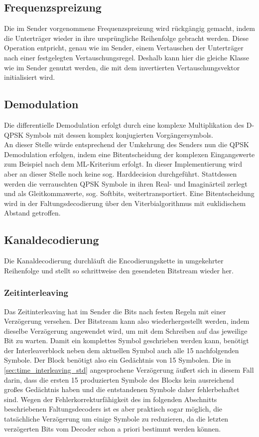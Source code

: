 \subsection{Frequenzspreizung}
Die im Sender vorgenommene Frequenzspreizung wird rückgängig gemacht, indem die Unterträger wieder in ihre ursprüngliche Reihenfolge gebracht werden. Diese Operation entpricht, genau wie im Sender, einem Vertauschen der Unterträger nach einer festgelegten Vertauschungsregel. Deshalb kann hier die gleiche Klasse wie im Sender genutzt werden, die mit dem invertierten Vertauschungsvektor initialisiert wird.

\subsection{Demodulation}
Die differentielle Demodulation erfolgt durch eine komplexe Multiplikation des D-QPSK Symbols mit dessen komplex konjugierten Vorgängersymbols.\\
An dieser Stelle würde entsprechend der Umkehrung des Senders nun die QPSK Demodulation erfolgen, indem eine Bitentscheidung der komplexen Eingangswerte zum Beispiel nach dem \ac{ML}-Kriterium erfolgt. In dieser Implementierung wird aber an dieser Stelle noch keine sog. Harddecision durchgeführt. Stattdessen werden die verrauschten QPSK Symbole in ihren Real- und Imaginärteil zerlegt und als Gleitkommawerte, sog. Softbits, weitertransportiert. Eine Bitentscheidung wird in der Faltungsdecodierung über den Viterbialgorithmus mit euklidischem Abstand getroffen.

\subsection{Kanaldecodierung}
Die Kanaldecodierung durchläuft die Encodierungskette in umgekehrter Reihenfolge und stellt so schrittweise den gesendeten Bitstream wieder her.

\subsubsection{Zeitinterleaving}
Das Zeitinterleaving hat im Sender die Bits nach festen Regeln mit einer Verzögerung versehen. Der Bitstream kann also wiederhergestellt werden, indem dieselbe Verzögerung angewendet wird, um mit dem Schreiben auf das jeweilige Bit zu warten. Damit ein komplettes Symbol geschrieben werden kann, benötigt der Interleaverblock neben dem aktuellen Symbol auch alle 15 nachfolgenden Symbole. Der Block benötigt also ein Gedächtnis von 15 Symbolen. Die in \ref{sec:time_interleaving_std} angesprochene Verzögerung äußert sich in diesem Fall darin, dass die ersten 15 produzierten Symbole des Blocks kein ausreichend großes Gedächtnis haben und die entstandenen Symbole daher fehlerbehaftet sind. Wegen der Fehlerkorrekturfähigkeit des im folgenden Abschnitts beschriebenen Faltungsdecoders ist es aber praktisch sogar möglich, die tatsächliche Verzögerung um einige Symbole zu reduzieren, da die letzten verzögerten Bits vom Decoder schon a priori bestimmt werden können.

